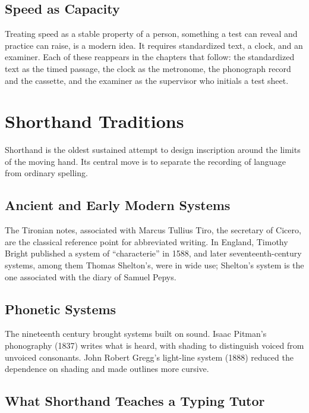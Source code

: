 \section{Speed as Capacity}

Treating speed as a stable property of a person, something a test can reveal and practice can raise, is a modern idea. It requires standardized text, a clock, and an examiner. Each of these reappears in the chapters that follow: the standardized text as the timed passage, the clock as the metronome, the phonograph record and the cassette, and the examiner as the supervisor who initials a test sheet.

\chapter{Shorthand Traditions}

Shorthand is the oldest sustained attempt to design inscription around the limits of the moving hand. Its central move is to separate the recording of language from ordinary spelling.

\section{Ancient and Early Modern Systems}

The Tironian notes, associated with Marcus Tullius Tiro, the secretary of Cicero, are the classical reference point for abbreviated writing.  In England, Timothy Bright published a system of ``characterie'' in 1588, and later seventeenth-century systems, among them Thomas Shelton's, were in wide use; Shelton's system is the one associated with the diary of Samuel Pepys. 

\section{Phonetic Systems}

The nineteenth century brought systems built on sound. Isaac Pitman's phonography (1837) writes what is heard, with shading to distinguish voiced from unvoiced consonants. John Robert Gregg's light-line system (1888) reduced the dependence on shading and made outlines more cursive. 

\section{What Shorthand Teaches a Typing Tutor}

